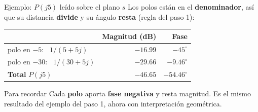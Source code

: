 \documentclass[aspectratio=169,11pt]{beamer}
\begin{document}
\begin{frame}{Ejemplo: $P(j5)$ leído sobre el plano $s$}
  \small
  \setlength{\parskip}{3pt}
  Los polos están en el \textbf{denominador}, así que su distancia \textbf{divide} y su ángulo \textbf{resta} (regla del paso 1):

  \begin{center}
    \renewcommand{\arraystretch}{1.2}
    \begin{tabular}{lrr}
      \hline
      & \textbf{Magnitud (dB)} & \textbf{Fase} \\
      \hline
      polo en $-5$: \ $1/(5+5j)$ & $-16.99$ & $-45^\circ$ \\
      polo en $-30$: \ $1/(30+5j)$ & $-29.66$ & $-9.46^\circ$ \\
      \hline
      \textbf{Total} $P(j5)$ & $\boxed{-46.65}$ & $\boxed{-54.46^\circ}$ \\
      \hline
    \end{tabular}
  \end{center}

  \begin{block}{Para recordar}
    Cada \textbf{polo} aporta \textbf{fase negativa} y resta magnitud. Es el mismo resultado del ejemplo del paso 1, ahora con interpretación geométrica.
  \end{block}
\end{frame}
\end{document}

